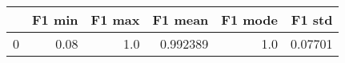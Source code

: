 \begin{tabular}{lrrrrr}
\toprule
{} &  F1 min &  F1 max &   F1 mean &  F1 mode &   F1 std \\
\midrule
0 &    0.08 &     1.0 &  0.992389 &      1.0 &  0.07701 \\
\bottomrule
\end{tabular}
